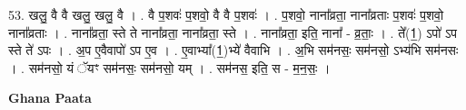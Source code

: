 \documentclass[17pt]{extarticle}
\begin{document}
53. खलु॒ वै वै खलु॒ खलु॒ वै । . वै प॒शवः॑ प॒शवो॒ वै वै प॒शवः॑ । . प॒शवो॒ नाना᳚व्रता॒ नाना᳚व्रताः प॒शवः॑ प॒शवो॒ नाना᳚व्रताः । . नाना᳚व्रता॒ स्ते ते नाना᳚व्रता॒ नाना᳚व्रता॒ स्ते । . नाना᳚व्रता॒ इति॒ नाना᳚ - व्र॒ताः॒ । . ते᳚(1॒) ऽपो॑ ऽप स्ते ते॑ ऽपः । . अ॒प ए॒वैवापो॑ ऽप ए॒व । . ए॒वाभ्या᳚(1॒)भ्ये॑ वैवाभि । . अ॒भि सम॑नसः॒ सम॑नसो॒ ऽभ्य॑भि सम॑नसः । . सम॑नसो॒ यं ॅयꣳ सम॑नसः॒ सम॑नसो॒ यम् । . सम॑नस॒ इति॒ स - म॒न॒सः॒ । \newline

\textbf{Ghana Paata } \newline
\end{document}
